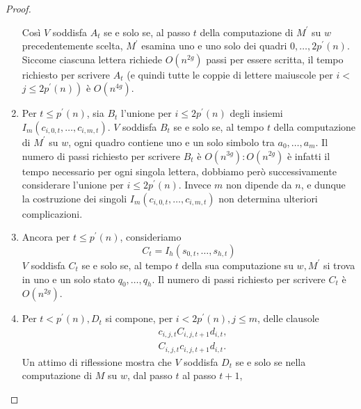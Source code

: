 \begin{proof}
\begin{enumerate}
$$              $$
              Così $V$ soddisfa $A_t$ se e solo se, al passo $t$ della
              computazione di $M^{\prime}$ su $w$ precedentemente scelta,
              $M^{\prime}$ esamina uno e uno solo dei quadri $0, \ldots, 2
                  p^{\prime}(n)$. Siccome ciascuna lettera richiede $O\left(n^{2
                      g}\right)$ passi per essere scritta, il tempo richiesto per
              scrivere $A_t$ (e quindi tutte le coppie di lettere maiuscole per
              $i<$ $\left.j \leq 2 p^{\prime}(n)\right)$ è $O\left(n^{4
                      g}\right)$.
        \item Per $t \leq p^{\prime}(n)$, sia $B_t$ l'unione per $i \leq 2
                  p^{\prime}(n)$ degli insiemi $I_m\left(c_{i, 0, t}, \ldots,
                  c_{i, m, t}\right)$. $V$ soddisfa $B_t$ se e solo se, al tempo
              $t$ della computazione di $M^{\prime}$ su $w$, ogni quadro
              contiene uno e un solo simbolo tra $a_0, \ldots, a_m$. Il
              numero di passi richiesto per scrivere $B_t$ è $O\left(n^{3
                      g}\right): O\left(n^{2 g}\right)$ è infatti il tempo
              necessario per ogni singola lettera, dobbiamo però
              successivamente considerare l'unione per $i \leq 2
                  p^{\prime}(n)$. Invece $m$ non dipende da $n$, e dunque la
              costruzione dei singoli $I_m\left(c_{i, 0, t}, \ldots, c_{i,
                      m, t}\right)$ non determina ulteriori complicazioni.
        \item Ancora per $t \leq p^{\prime}(n)$, consideriamo
              $$
                  C_t=I_h\left(s_{0, t}, \ldots, s_{h, t}\right)
              $$
              $V$ soddisfa $C_t$ se e solo se, al tempo $t$ della sua
              computazione su $w, M^{\prime}$ si trova in uno e un solo stato
              $q_0, \ldots, q_h$. Il numero di passi richiesto per scrivere
              $C_t$ è $O\left(n^{2 g}\right)$.
        \item Per $t<p^{\prime}(n), D_t$ si compone, per $i<2 p^{\prime}(n), j
                  \leq m$, delle clausole
              $$
                  \begin{aligned}
                       & c_{i, j, t} C_{i, j, t+1} d_{i, t},  \\
                       & C_{i, j, t} c_{i, j, t+1} d_{i, t} .
                  \end{aligned}
              $$
              Un attimo di riflessione mostra che $V$ soddisfa $D_t$ se e solo
              se nella computazione di $M$ su $w$, dal passo $t$ al passo $t+1$,

\end{enumerate}
\end{proof}
